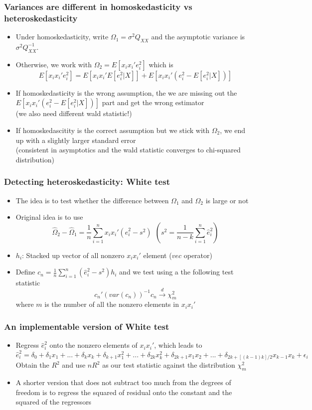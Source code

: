 \documentclass[aspectratio=169]{beamer}
\begin{document}
\begin{frame}
\frametitle{Variances are different in homoskedasticity vs heteroskedasticity}
\begin{itemize}
\item Under homoskedasticity, write $\Omega_1=\sigma^2 Q_{XX}$ and the asymptotic variance is $\sigma^2 Q_{XX}^{-1}$. 
\item Otherwise, we work with $\Omega_2 = E[x_ix_i'e_i^2]$ which is
\[
E[x_ix_i'e_i^2]=E[x_ix_i'E[e_i^2|X]]+E[x_ix_i'(e_i^2 -E[e_i^2|X])]
\]
\item  If homoskedasticity is the wrong assumption, the we are missing out the $E[x_ix_i'(e_i^2 -E[e_i^2|X])]$ part and get the wrong estimator\\ (we also need different wald statistic!)
\item  If homoskedascitity is the correct assumption but we stick with $\Omega_2$, we end up with a slightly larger standard error \\(consistent in asymptotics and the wald statistic converges to chi-squared distribution) 
\end{itemize}
\end{frame}

\begin{frame}
\frametitle{Detecting heteroskedasticity: White test}
\begin{itemize}
\item The idea is to test whether the difference between $\Omega_1$ and $\Omega_2$ is large or not
\item Original idea is to use
\[
 \widehat{\Omega}_2-\widehat{\Omega}_1= \frac{1}{n}\sum_{i=1}^nx_ix_i'(\hat{e}_i^2-s^2) \ \ (s^2= \frac{1}{n-k}\sum_{i=1}^n\hat{e}_i^2)
\]
\item $h_i$: Stacked up vector of all nonzero $x_ix_i'$ element ($vec$ operator)
\item Define $c_n=\frac{1}{n}\sum_{i=1}^n(\hat{e}_i^2-s^2)h_i$ and we test using a the following test statistic
\[
c_n'(var(c_n))^{-1}c_n\xrightarrow{d}\chi^2_m
\]
where $m$ is the number of all the nonzero elements in $x_ix_i'$
\end{itemize}
\end{frame}

\begin{frame}
\frametitle{An implementable version of White test}
\begin{itemize}
\item Regress  $\hat{e}_i^2$ onto the nonzero elements of $x_ix_i'$, which leads to
\[
\hat{e}_i^2 = \delta_0+\delta_1 x_1 + ... + \delta_k x_k + \delta_{k+1} x_1^2 + ... + \delta_{2k}x_k^2 + \delta_{2k+1}x_1x_2+...+\delta_{2k+[(k-1)k]/2}x_{k-1}x_k+\epsilon_i
\]
Obtain the $R^2$ and use $nR^2$ as our test statistic against the distribution $\chi^2_{m}$
\item  A shorter version that does not subtract too much from the degrees of freedom is to regress the squared of residual onto the constant and the squared of the regressors
\end{itemize}
\end{frame}
\end{document}
